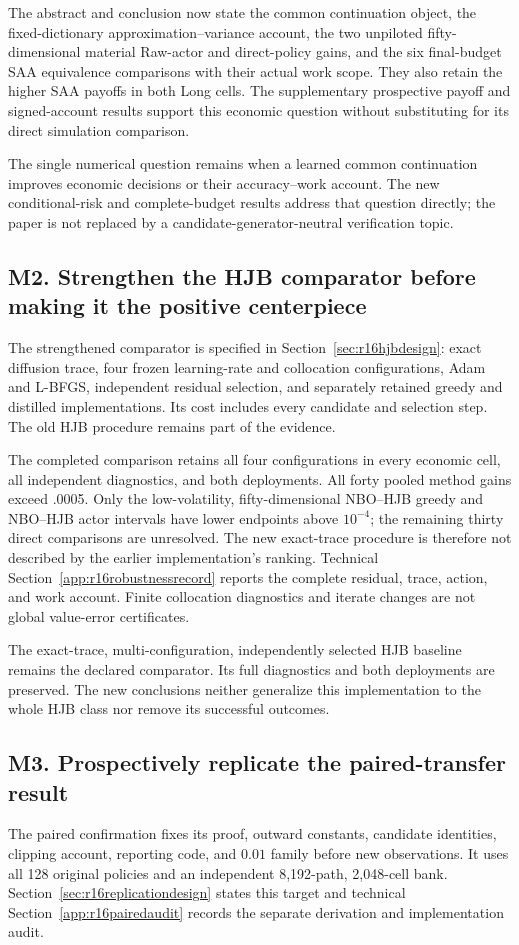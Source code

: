 The abstract and conclusion now state the common continuation object, the fixed-dictionary approximation--variance account, the two unpiloted fifty-dimensional material Raw-actor and direct-policy gains, and the six final-budget SAA equivalence comparisons with their actual work scope. They also retain the higher SAA payoffs in both Long cells. The supplementary prospective payoff and signed-account results support this economic question without substituting for its direct simulation comparison.


The single numerical question remains when a learned common continuation improves economic decisions or their accuracy--work account. The new conditional-risk and complete-budget results address that question directly; the paper is not replaced by a candidate-generator-neutral verification topic.

\subsection*{M2. Strengthen the HJB comparator before making it the positive centerpiece}\label{resp:M2}
The strengthened comparator is specified in Section~\ref{sec:r16hjbdesign}: exact diffusion trace, four frozen learning-rate and collocation configurations, Adam and L-BFGS, independent residual selection, and separately retained greedy and distilled implementations. Its cost includes every candidate and selection step. The old HJB procedure remains part of the evidence.

The completed comparison retains all four configurations in every economic cell, all independent diagnostics, and both deployments. All forty pooled method gains exceed .0005. Only the low-volatility, fifty-dimensional NBO--HJB greedy and NBO--HJB actor intervals have lower endpoints above $10^{-4}$; the remaining thirty direct comparisons are unresolved. The new exact-trace procedure is therefore not described by the earlier implementation's ranking. Technical Section~\ref{app:r16robustnessrecord} reports the complete residual, trace, action, and work account. Finite collocation diagnostics and iterate changes are not global value-error certificates.


The exact-trace, multi-configuration, independently selected HJB baseline remains the declared comparator. Its full diagnostics and both deployments are preserved. The new conclusions neither generalize this implementation to the whole HJB class nor remove its successful outcomes.

\subsection*{M3. Prospectively replicate the paired-transfer result}\label{resp:M3}
The paired confirmation fixes its proof, outward constants, candidate identities, clipping account, reporting code, and $0.01$ family before new observations. It uses all 128 original policies and an independent 8,192-path, 2,048-cell bank. Section~\ref{sec:r16replicationdesign} states this target and technical Section~\ref{app:r16pairedaudit} records the separate derivation and implementation audit.

